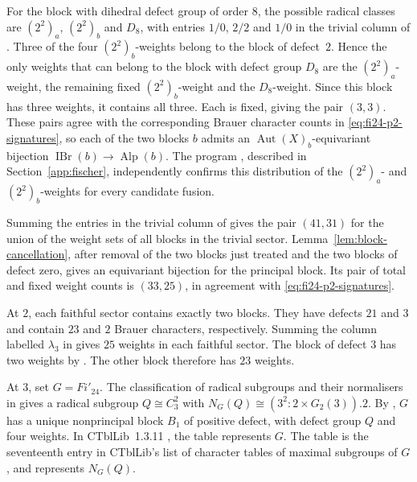 \documentclass[10pt]{amsart}
\theoremstyle{definition}
\let\oldendproof\endproof
\renewenvironment{proof}[1][\proofname]{%
  \oldproof[\bfseries #1]%
}{\oldendproof}
\DeclareMathOperator{\Aut}{Aut}
\DeclareMathOperator{\IBr}{IBr}
\DeclareMathOperator{\Alp}{Alp}
\numberwithin{equation}{section}
\numberwithin{table}{section}
\begin{document}
\begin{proof}
For the block with dihedral defect group of order $8$, the possible radical
classes are $(2^2)_a$, $(2^2)_b$ and $D_8$, with entries $1/0$, $2/2$ and $1/0$
in the trivial column of \cite[Table~8]{AnDietrich2012}.
Three of the four $(2^2)_b$-weights belong to the block of defect~$2$.
Hence the only weights that can belong to the block with defect group
$D_8$ are the $(2^2)_a$-weight, the remaining fixed $(2^2)_b$-weight and
the $D_8$-weight. Since this block has three weights, it contains all three.
Each is fixed, giving the pair $(3,3)$.
These pairs agree with the corresponding Brauer character counts
in \eqref{eq:fi24-p2-signatures}, so each of the two blocks $b$ admits an
$\Aut(X)_b$-equivariant bijection $\IBr(b)\to\Alp(b)$.
The program , described in Section~\ref{app:fischer},
independently confirms this distribution of the $(2^2)_a$- and
$(2^2)_b$-weights for every candidate fusion.

Summing the entries in the trivial column of
\cite[Table~8]{AnDietrich2012} gives the pair $(41,31)$ for the union
of the weight sets of all blocks in the trivial sector.
Lemma~\ref{lem:block-cancellation}, after removal of the two blocks just
treated and the two blocks of defect zero, gives an equivariant bijection
for the principal block.  Its pair of total and fixed weight counts is
$(33,25)$, in agreement with \eqref{eq:fi24-p2-signatures}.

At $2$, each faithful sector contains exactly two blocks.
They have defects $21$ and $3$ and contain $23$ and $2$ Brauer
characters, respectively. Summing the column labelled $\lambda_3$ in
\cite[Table~8]{AnDietrich2012} gives $25$ weights in each faithful sector.  The
block of defect $3$ has two weights by
\cite[Theorem~13.7]{Sambale2014}.  The other block therefore has $23$
weights.

At $3$, set $G=Fi'_{24}$. The classification of radical subgroups and
their normalisers in \cite[Proposition~4.1 and Table~1]{AnCannonOBrienUngerFi24}
gives a radical subgroup $Q\cong C_3^2$ with
$N_G(Q)\cong(3^2\!:\!2\times G_2(3)).2$.
By \cite[Lemma~4.2(c) and Theorem~4.3]{AnCannonOBrienUngerFi24}, $G$
has a unique nonprincipal block $B_1$ of positive defect, with defect
group $Q$ and four weights. In CTblLib~1.3.11 \cite{CTblLib2025},
the table  represents $G$. The table
 is the seventeenth entry in CTblLib's list of
character tables of maximal subgroups of $G$, and represents $N_G(Q)$.


\end{proof}
\end{document}
